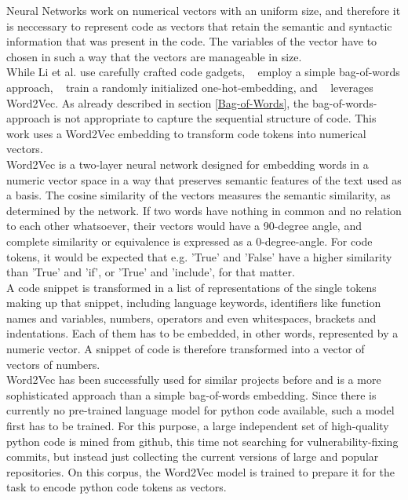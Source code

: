 \documentclass[
	a4paper,
	pagesize,
	pdftex,
	12pt,
	twoside, %
	BCOR=5mm, %
	ngerman,
	fleqn,
	final,
	]{scrartcl}
\begin{document}
Neural Networks work on numerical vectors with an uniform size, and therefore it is neccessary to represent code as vectors that retain the semantic and syntactic information that was present in the code. The variables of the vector have to chosen in such a way that the vectors are manageable in size.\\
While Li et al.\cite{Li.2018} use carefully crafted code gadgets, ~\cite{Hovsepyan.2012} employ a simple bag-of-words approach, ~\cite{Russell.2018} train a randomly initialized one-hot-embedding, and ~\cite{Liu.2018} leverages Word2Vec. As already described in section \ref{Bag-of-Words}, the bag-of-words-approach is not appropriate to capture the sequential structure of code. This work uses a Word2Vec embedding to transform code tokens into numerical vectors.\\
Word2Vec is a two-layer neural network designed for embedding words in a numeric vector space in a way that preserves semantic features of the text used as a basis. The cosine similarity of the vectors measures the semantic similarity, as determined by the network. If two words have nothing in common and no relation to each other whatsoever, their vectors would have a 90-degree angle, and complete similarity or equivalence is expressed as a 0-degree-angle. For code tokens, it would be expected that e.g. 'True' and 'False' have a higher similarity than 'True' and 'if', or 'True' and 'include', for that matter.\\
A code snippet is transformed in a list of representations of the single tokens making up that snippet, including language keywords, identifiers like function names and variables, numbers, operators and even whitespaces, brackets and indentations. Each of them has to be embedded, in other words, represented by a numeric vector. A snippet of code is therefore transformed into a vector of vectors of numbers.\\
Word2Vec has been successfully used for similar projects before \cite{Liu.2018} and is a more sophisticated approach than a simple bag-of-words embedding. Since there is currently no pre-trained language model for python code available, such a model first has to be trained. For this purpose, a large independent set of high-quality python code is mined from github, this time not searching for vulnerability-fixing commits, but instead just collecting the current versions of large and popular repositories. On this corpus, the Word2Vec model is trained to prepare it for the task to encode python code tokens as vectors.
\end{document}
